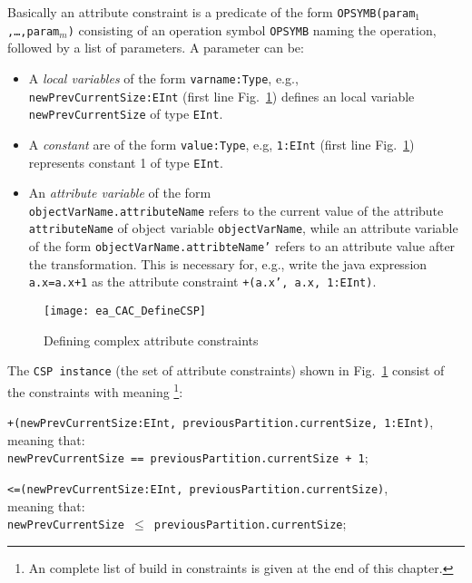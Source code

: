 Basically an attribute constraint is a predicate of the form \texttt{OPSYMB(param$_1$,\ldots,param$_m$)} consisting of an operation symbol \texttt{OPSYMB} naming the operation, followed by a list of parameters. A parameter can be:
\begin{itemize}
    \item A \emph{local variables} of the form \texttt{varname:Type}, e.g., \\
    \texttt{newPrevCurrentSize:EInt} (first line Fig.~\ref{ea:ea_CAC_DefineCSP}) defines an local variable \texttt{newPrevCurrentSize} of type \texttt{EInt}. 
    \item A \emph{constant} are of the form \texttt{value:Type}, e.g, \texttt{1:EInt} (first line Fig.~\ref{ea:ea_CAC_DefineCSP}) represents constant 1 of type \texttt{EInt}.
    \item An \emph{attribute variable} of the form\\
     \texttt{objectVarName.attributeName} refers to the current value of the attribute \texttt{attributeName} of object variable 	\texttt{objectVarName}, while an attribute variable of the form \texttt{objectVarName.attribteName'} refers to an attribute value after the transformation. This is necessary for, 	e.g., write the java expression \texttt{a.x=a.x+1} as the attribute constraint \texttt{+(a.x', a.x, 1:EInt)}. 
\end{itemize}


 
\begin{figure}[htbp]
\begin{center}
  \texttt{[image: ea\_CAC\_DefineCSP]}
  \caption{Defining complex attribute constraints}  
  \label{ea:ea_CAC_DefineCSP}
\end{center}
\end{figure}

The \texttt{CSP instance} (the set of attribute constraints) shown in Fig.~\ref{ea:ea_CAC_DefineCSP} consist of the constraints with meaning \footnote{An complete list of build in constraints is given at the end of this chapter.}:

\texttt{\small +(newPrevCurrentSize:EInt, previousPartition.currentSize, 1:EInt)},\\
meaning that:\\
\texttt{\small newPrevCurrentSize == previousPartition.currentSize + 1};

\texttt{\small<=(newPrevCurrentSize:EInt, previousPartition.currentSize)},\\
meaning that:\\
 \texttt{\small newPrevCurrentSize $\leq$ previousPartition.currentSize};

